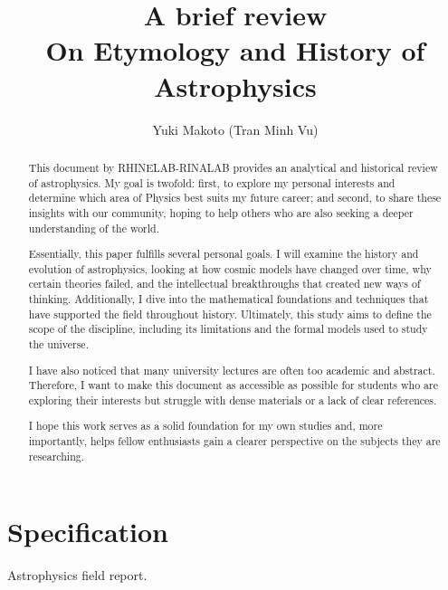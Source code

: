\documentclass[10pt,a4paper]{article}
\title{\textbf{A brief review} \\ On Etymology and History of Astrophysics} %
\author{Yuki Makoto (Tran Minh Vu)} %
\affiliation{} %
\begin{document}
\maketitle

\begin{abstract}
    \noindent
    This document by RHINELAB-RINALAB provides an analytical and historical review of astrophysics. My goal is twofold: first, to explore my personal interests and determine which area of Physics best suits my future career; and second, to share these insights with our community, hoping to help others who are also seeking a deeper understanding of the world.

Essentially, this paper fulfills several personal goals. I will examine the history and evolution of astrophysics, looking at how cosmic models have changed over time, why certain theories failed, and the intellectual breakthroughs that created new ways of thinking. Additionally, I dive into the mathematical foundations and techniques that have supported the field throughout history. Ultimately, this study aims to define the scope of the discipline, including its limitations and the formal models used to study the universe.

I have also noticed that many university lectures are often too academic and abstract. Therefore, I want to make this document as accessible as possible for students who are exploring their interests but struggle with dense materials or a lack of clear references.

I hope this work serves as a solid foundation for my own studies and, more importantly, helps fellow enthusiasts gain a clearer perspective on the subjects they are researching.

\end{abstract}

\vspace{2.5cm}



\thispagestyle{firstpage}

\pagebreak


\newgeometry{} %

\section{Specification}
\label{sec:spec}

Astrophysics field report. 
\end{document}
